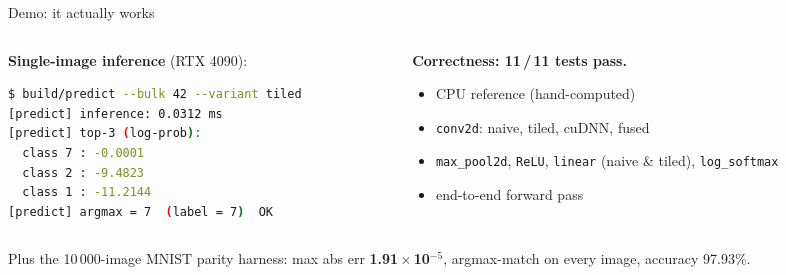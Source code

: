 \documentclass[aspectratio=169,10pt]{beamer}
\begin{document}
\begin{frame}[fragile]{Demo: it actually works}
  \begin{columns}[T,onlytextwidth]
  \begin{column}{0.52\textwidth}
    \textbf{Single-image inference} (RTX 4090):
    \begin{lstlisting}[language=bash,keywordstyle=\color{black},basicstyle=\ttfamily\scriptsize,xleftmargin=0pt,xrightmargin=10pt]
$ build/predict --bulk 42 --variant tiled
[predict] inference: 0.0312 ms
[predict] top-3 (log-prob):
  class 7 : -0.0001
  class 2 : -9.4823
  class 1 : -11.2144
[predict] argmax = 7  (label = 7)  OK
    \end{lstlisting}
  \end{column}
  \begin{column}{0.48\textwidth}
    \textbf{Correctness: 11\,/\,11 tests pass.}

    \vspace{0.4em}
    \scriptsize
    \begin{itemize}\setlength\itemsep{0.3em}
      \item CPU reference (hand-computed)
      \item \texttt{conv2d}: naive, tiled, cuDNN, fused
      \item \texttt{max\_pool2d}, \texttt{ReLU},
            \texttt{linear} (naive \& tiled),
            \texttt{log\_softmax}
      \item end-to-end forward pass
    \end{itemize}
  \end{column}
  \end{columns}

  \vspace{0.3em}
  \centering\footnotesize Plus the 10\,000-image MNIST parity harness:
  max abs err \textbf{1.91\,$\times$\,10$^{-5}$}, argmax-match on
  every image, accuracy 97.93\%.
\end{frame}
\end{document}
